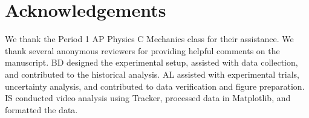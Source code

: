 \documentclass[reprint,amsmath,amssymb,aps,twoside]{revtex4-2}
\begin{document}
\section{Acknowledgements} 
We thank the Period 1 AP Physics C Mechanics class for their assistance. We thank several anonymous reviewers for providing helpful comments on the manuscript. BD designed the experimental setup, assisted with data collection, and contributed to the historical analysis. AL assisted with experimental trials, uncertainty analysis, and contributed to data verification and figure preparation. IS conducted video analysis using Tracker, processed data in Matplotlib, and formatted the data. 








\end{document}
